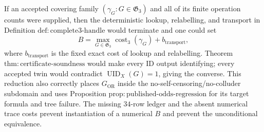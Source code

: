 If an accepted covering family \((\gamma_G:G\in\mathfrak G_3)\) and all of its finite operation counts were supplied, then the deterministic lookup, relabelling, and transport in Definition \(\mathrm{def{:}complete3\text{-}handle}\) would terminate and one could set
\[
B=\max_{G\in\mathfrak G_3}\operatorname{cost}_3(\gamma_G)+b_{\mathrm{transport}},
\]
where \(b_{\mathrm{transport}}\) is the fixed exact cost of lookup and relabelling. Theorem \(\mathrm{thm{:}certificate\text{-}soundness}\) would make every \(\mathrm{ID}\) output identifying; every accepted twin would contradict \(\operatorname{UID}_X(G)=1\), giving the converse. This reduction also correctly places \(G_{\mathrm{OR}}\) inside the no-self-censoring/no-colluder subdomain and uses Proposition \(\mathrm{prop{:}published\text{-}odds\text{-}regression}\) for its target formula and tree failure. The missing \(34\)-row ledger and the absent numerical trace costs prevent instantiation of a numerical \(B\) and prevent the unconditional equivalence.